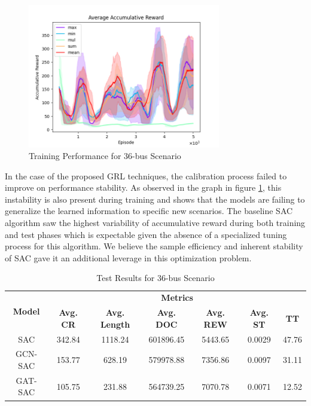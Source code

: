 \begin{figure}[ht]
	\includegraphics[width=0.75\textwidth]{graphs/aggr/acc_reward_train.png}
	\caption{Training Performance for 36-bus Scenario}
	\label{fig:36-training-performance}
\end{figure}


In the case of the proposed \ac{GRL} techniques, the calibration process failed to improve on performance stability. As observed in the graph in figure \ref{fig:36-training-performance}, this instability is also present during training and shows that the models are failing to generalize the learned information to specific new scenarios. The baseline \ac{SAC} algorithm saw the highest variability of accumulative reward during both training and test phases which is expectable given the absence of a specialized tuning process for this algorithm. We believe the sample efficiency and inherent stability of \ac{SAC}  gave it an additional leverage in this optimization problem.

\begin{table}[h!]
	\centering
	\caption{Test Results for 36-bus Scenario}
	\begin{tabular}{ccccccc}
		\toprule
		\multirow{2}{*}{\textbf{Model}} & \multicolumn{6}{c}{\textbf{Metrics}} \\ 
		\cmidrule(lr){2-7}
		&  \textbf{Avg. CR} & \textbf{Avg. Length} & \textbf{Avg. DOC} & \textbf{Avg. REW} & \textbf{Avg. ST} & \textbf{TT} \\ 
		\midrule
		SAC & 342.84 & 1118.24 & 601896.45 & 5443.65 & 0.0029 & 47.76 \\
		GCN-SAC & 153.77 & 628.19 & 579978.88 & 7356.86 & 0.0097 & 31.11 \\
		GAT-SAC &105.75 & 231.88 & 564739.25 & 7070.78 & 0.0071 & 12.52 \\
		\bottomrule
	\end{tabular}
	\label{tab:test-36}
\end{table}

